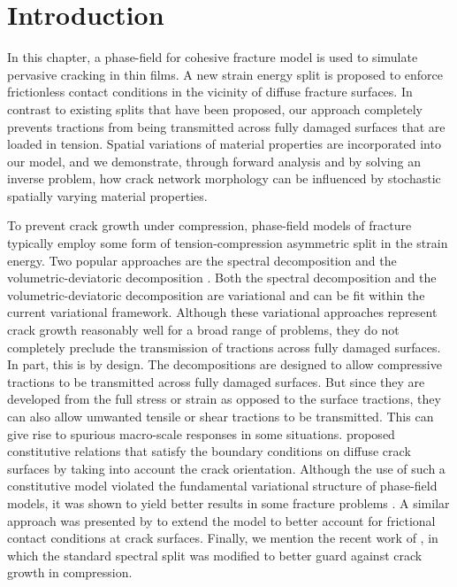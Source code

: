 \section{Introduction}
\label{section: Chapter4/intro}

In this chapter, a phase-field for cohesive fracture model is used to simulate pervasive cracking in thin films. A new strain energy split is proposed to enforce frictionless contact conditions in the vicinity of diffuse fracture surfaces. In contrast to existing splits that have been proposed, our approach completely prevents tractions from being transmitted across fully damaged surfaces that are loaded in tension. Spatial variations of material properties are incorporated into our model, and we demonstrate, through forward analysis and by solving an inverse problem, how crack network morphology can be influenced by stochastic spatially varying material properties.

To prevent crack growth under compression, phase-field models of fracture typically employ some form of tension-compression asymmetric split in the strain energy. Two popular approaches are the spectral decomposition \cite{miehe_2010_p1, miehe_2010_p2} and the volumetric-deviatoric decomposition \cite{AMOR20091209}. Both the spectral decomposition and the volumetric-deviatoric decomposition are variational and can be fit within the current variational framework.
Although these variational approaches represent crack growth reasonably well for a broad range of problems, they do not completely preclude the transmission of tractions across fully damaged surfaces.   In part, this is by design.  The decompositions are designed to allow compressive tractions to be transmitted across fully damaged surfaces.  But since they are developed from the full stress or strain as opposed to the surface tractions, they can also allow umwanted tensile or shear tractions to be transmitted. This can give rise to spurious macro-scale responses in some situations.
\citet{strobl2015novel} proposed constitutive relations that satisfy the boundary conditions on diffuse crack surfaces by taking into account the crack orientation. Although the use of such a constitutive model violated the fundamental variational structure of phase-field models, it was shown to yield better results in some fracture problems \cite{strobl2016constitutive}.  A similar approach was presented by  \citet{fei2019phase, fei2020phasefield} to extend the model to better account for frictional contact conditions at crack surfaces.  Finally, we mention the recent work of \citet{Landis-fatigue}, in which the standard spectral split was modified to better guard against crack growth in compression.

